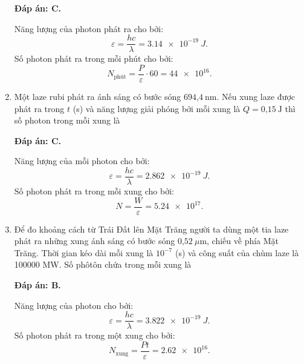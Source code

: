 \begin{enumerate}[label=\bfseries Câu \arabic*:]
	\loigiai
	{		\textbf{Đáp án: C.}

Năng lượng của photon phát ra cho bởi:
$$
	\varepsilon = \dfrac{hc}{\lambda} = \SI{3,14 e-19}{J}.
$$		
Số photon phát ra trong mỗi phút cho bởi:
$$
	N_{\text{phút}} = \dfrac{P}{\varepsilon} \cdot 60 = \num{44 e16}.
$$
		
	}
	
	\item {} 
	
	\cauhoi
	{Một laze rubi phát ra ánh sáng có bước sóng $\text{694,4}\ \text{nm}$. Nếu xung laze được phát ra trong $t$ (s) và năng lượng giải phóng bởi mỗi xung là $Q = \text{0,15}\ \text{J}$ thì số photon trong mỗi xung là
	}
	
	\loigiai
	{		\textbf{Đáp án: C.}
		
Năng lượng của mỗi photon cho bởi:
$$
	\varepsilon = \dfrac{hc}{\lambda} = \SI{2,862 e-19}{J}.
$$
Số photon phát ra trong mỗi xung cho bởi:
$$
	N = \dfrac{W}{\varepsilon} = \num{5,24 e17}.
$$
		
	}
	
	\item {} 
	
	\cauhoi
	{Để đo khoảng cách từ Trái Đất lên Mặt Trăng người ta dùng một tia laze phát ra những xung ánh sáng có bước sóng $\text{0,52}\ \mu\text{m}$, chiếu về phía Mặt Trăng. Thời gian kéo dài mỗi xung là $10^{-7}$ (s) và công suất của chùm laze là 100000 MW. Số phôtôn chứa trong mỗi xung là
	}
	
	\loigiai
	{		\textbf{Đáp án: B.}
		
Năng lượng của photon cho bởi:
$$
	\varepsilon = \dfrac{hc}{\lambda} = \SI{3,822 e-19}{J}.
$$
Số photon phát ra trong một xung cho bởi:
$$
	N_{\text{xung}} = \dfrac{Pt}{\varepsilon} = \num{2,62 e16}.
$$
		
}
\end{enumerate}
